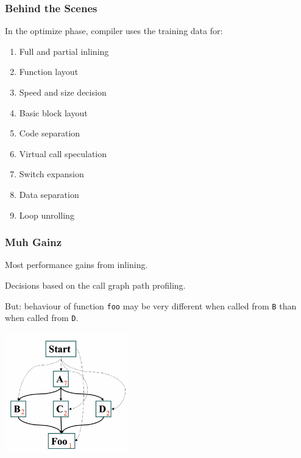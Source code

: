 \begin{frame}
\frametitle{Behind the Scenes}

\large
\begin{changemargin}{2cm}
In the optimize phase, compiler uses the training data for:

\begin{enumerate}
\item Full and partial inlining
\item Function layout
\item Speed and size decision
\item Basic block layout 
\item Code separation
\item Virtual call speculation
\item Switch expansion
\item Data separation
\item Loop unrolling
\end{enumerate}
\end{changemargin}
\end{frame}



\begin{frame}
\frametitle{Muh Gainz}

\large
\begin{changemargin}{2cm}
Most performance gains from inlining.

Decisions based on the call graph path profiling. 

But: behaviour of function \texttt{foo} may be very different when called from \texttt{B} than when called from \texttt{D}. 


\begin{center}
	\includegraphics[width=0.4\textwidth]{images/callpaths.png}
\end{center}
\end{changemargin}
\end{frame}



